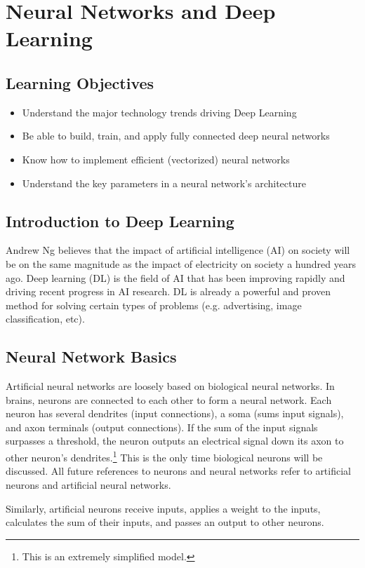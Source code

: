 \chapter{Neural Networks and Deep Learning}
\section*{Learning Objectives}
\begin{itemize}
  \item Understand the major technology trends driving Deep Learning
  \item Be able to build, train, and apply fully connected deep neural networks
  \item Know how to implement efficient (vectorized) neural networks
  \item Understand the key parameters in a neural network's architecture
\end{itemize}

\section{Introduction to Deep Learning}
Andrew Ng believes that the impact of artificial intelligence (AI) on society will be on the same magnitude as the impact of electricity on society a hundred years ago. Deep learning (DL) is the field of AI that has been improving rapidly and driving recent progress in AI research. DL is already a powerful and proven method for solving certain types of problems (e.g. advertising, image classification, etc). 


\section{Neural Network Basics}
Artificial neural networks are loosely based on biological neural networks. In brains, neurons are connected to each other to form a neural network. Each neuron has several dendrites (input connections), a soma (sums input signals), and axon terminals (output connections). If the sum of the input signals surpasses a threshold, the neuron outputs an electrical signal down its axon to other neuron's dendrites.\footnote{This is an extremely simplified model.} This is the only time biological neurons will be discussed. All future references to neurons and neural networks refer to artificial neurons and artificial neural networks.

Similarly, artificial neurons receive inputs, applies a weight to the inputs, calculates the sum of their inputs, and passes an output to other neurons.


